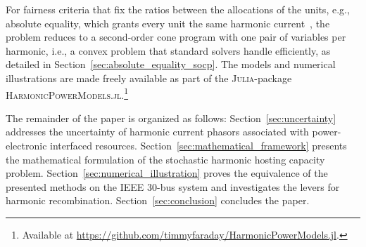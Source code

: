 For fairness criteria that fix the ratios between the allocations of the units, e.g., absolute equality, which grants every unit the same harmonic current~\cite{vanacker_hosting_2026}, the problem reduces to a second-order cone program with one pair of variables per harmonic, i.e., a convex problem that standard solvers handle efficiently, as detailed in Section~\ref{sec:absolute_equality_socp}. %
The models and numerical illustrations are made freely available as part of the \textsc{Julia}-package \textsc{HarmonicPowerModels.jl}.\footnote{Available at \url{https://github.com/timmyfaraday/HarmonicPowerModels.jl}.}

The remainder of the paper is organized as follows: Section~\ref{sec:uncertainty} addresses the uncertainty of harmonic current phasors associated with power-electronic interfaced resources. Section~\ref{sec:mathematical_framework} presents the mathematical formulation of the stochastic harmonic hosting capacity problem. Section~\ref{sec:numerical_illustration} proves the equivalence of the presented methods on the IEEE 30-bus system and investigates the levers for harmonic recombination. Section~\ref{sec:conclusion} concludes the paper.
